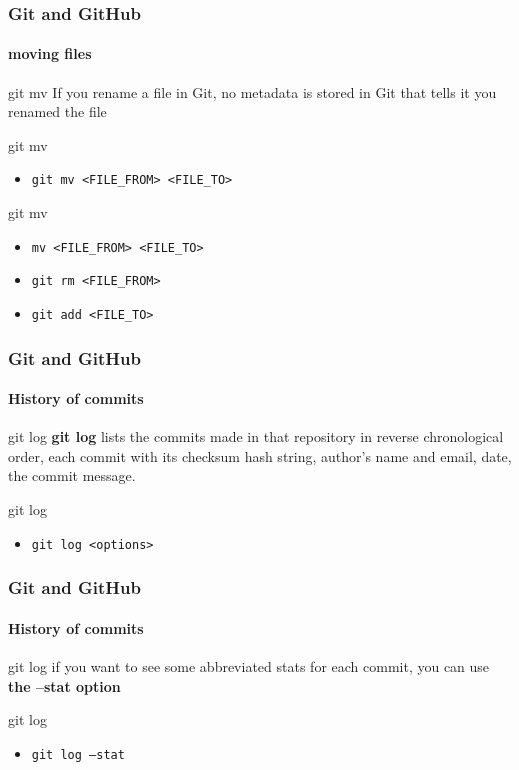 \begin{frame}
	\frametitle{Git and GitHub}
    \framesubtitle{moving files}
    \addtocounter{nframe}{1}

	\begin{block}{git mv}
		If you rename a file in Git, no metadata is stored in Git that tells it you renamed the file
	\end{block}

	\begin{block}{git mv}
		\begin{itemize}
			\item \texttt{git mv <FILE_FROM> <FILE_TO>}
		\end{itemize}
	\end{block}

	\begin{block}{git mv}
		\begin{itemize}
			\item \texttt{mv <FILE_FROM> <FILE_TO>}
			\item \texttt{git rm <FILE_FROM>}
			\item \texttt{git add <FILE_TO>}
		\end{itemize}
	\end{block}
\end{frame}

\begin{frame}
	\frametitle{Git and GitHub}
    \framesubtitle{History of commits}
    \addtocounter{nframe}{1}

	\begin{block}{git log}
		\textbf{git log} lists the commits made in that repository in reverse chronological order, each commit with its checksum hash string, author’s name and email, date, the commit message.
	\end{block}

	\begin{block}{git log}
		\begin{itemize}
			\item \texttt{git log <options>}
		\end{itemize}
	\end{block}

\end{frame}

\begin{frame}
	\frametitle{Git and GitHub}
    \framesubtitle{History of commits}
    \addtocounter{nframe}{1}

	\begin{block}{git log}
		if you want to see some abbreviated stats for each commit, you can use \textbf{the --stat option}
	\end{block}

	\begin{block}{git log}
		\begin{itemize}
			\item \texttt{git log --stat}
		\end{itemize}
	\end{block}

\end{frame}

